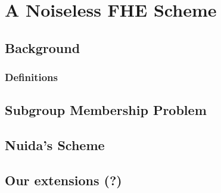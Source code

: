 \chapter{A Noiseless FHE Scheme}
\section{Background}
\subsection{Definitions}
\section{Subgroup Membership Problem}
\section{Nuida's Scheme}
\section{Our extensions (?)}